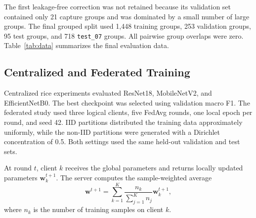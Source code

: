 \documentclass[conference]{IEEEtran}
\begin{document}
The first leakage-free correction was not retained because its validation set contained only 21 capture groups and was dominated by a small number of large groups. The final grouped split used 1,448 training groups, 253 validation groups, 95 test groups, and 718 \texttt{test\_07} groups. All pairwise group overlaps were zero. Table~\ref{tab:data} summarizes the final evaluation data.

\begin{table}[t]
\caption{Leakage-Aware Dataset Splits}
\label{tab:data}
\centering
{}
\end{table}

\subsection{Centralized and Federated Training}

Centralized rice experiments evaluated ResNet18, MobileNetV2, and EfficientNetB0. The best checkpoint was selected using validation macro F1. The federated study used three logical clients, five FedAvg rounds, one local epoch per round, and seed 42. IID partitions distributed the training data approximately uniformly, while the non-IID partitions were generated with a Dirichlet concentration of 0.5. Both settings used the same held-out validation and test sets.

At round $t$, client $k$ receives the global parameters and returns locally updated parameters $\mathbf{w}_{k}^{t+1}$. The server computes the sample-weighted average
\begin{equation}
\mathbf{w}^{t+1} =
\sum_{k=1}^{K}
\frac{n_k}{\sum_{j=1}^{K} n_j}
\mathbf{w}_{k}^{t+1},
\label{eq:fedavg}
\end{equation}
where $n_k$ is the number of training samples on client $k$.
\end{document}
